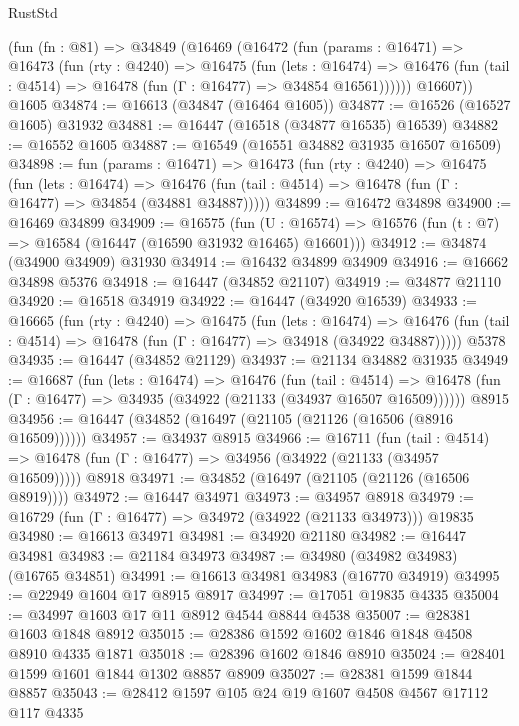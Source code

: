 \begin{lexlean}{RustStd}
\begin{coremodule}
    (fun (fn : @81) =>
    @34849
      (@16469
        (@16472
          (fun (params : @16471) =>
          @16473
            (fun (rty : @4240) =>
            @16475
              (fun (lets : @16474) =>
              @16476 (fun (tail : @4514) => @16478 (fun (Γ : @16477) => @34854 @16561))))))
        @16607))
    @1605
@34874 := @16613 (@34847 (@16464 @1605))
@34877 := @16526 (@16527 @1605) @31932
@34881 := @16447 (@16518 (@34877 @16535) @16539)
@34882 := @16552 @1605
@34887 := @16549 (@16551 @34882 @31935 @16507 @16509)
@34898 := fun (params : @16471) =>
  @16473
    (fun (rty : @4240) =>
    @16475
      (fun (lets : @16474) =>
      @16476 (fun (tail : @4514) => @16478 (fun (Γ : @16477) => @34854 (@34881 @34887)))))
@34899 := @16472 @34898
@34900 := @16469 @34899
@34909 := @16575
    (fun (U : @16574) => @16576 (fun (t : @7) => @16584 (@16447 (@16590 @31932 @16465) @16601)))
@34912 := @34874 (@34900 @34909) @31930
@34914 := @16432 @34899 @34909
@34916 := @16662 @34898 @5376
@34918 := @16447 (@34852 @21107)
@34919 := @34877 @21110
@34920 := @16518 @34919
@34922 := @16447 (@34920 @16539)
@34933 := @16665
    (fun (rty : @4240) =>
    @16475
      (fun (lets : @16474) =>
      @16476 (fun (tail : @4514) => @16478 (fun (Γ : @16477) => @34918 (@34922 @34887)))))
    @5378
@34935 := @16447 (@34852 @21129)
@34937 := @21134 @34882 @31935
@34949 := @16687
    (fun (lets : @16474) =>
    @16476
      (fun (tail : @4514) =>
      @16478 (fun (Γ : @16477) => @34935 (@34922 (@21133 (@34937 @16507 @16509))))))
    @8915
@34956 := @16447 (@34852 (@16497 (@21105 (@21126 (@16506 (@8916 @16509))))))
@34957 := @34937 @8915
@34966 := @16711
    (fun (tail : @4514) => @16478 (fun (Γ : @16477) => @34956 (@34922 (@21133 (@34957 @16509)))))
    @8918
@34971 := @34852 (@16497 (@21105 (@21126 (@16506 @8919))))
@34972 := @16447 @34971
@34973 := @34957 @8918
@34979 := @16729 (fun (Γ : @16477) => @34972 (@34922 (@21133 @34973))) @19835
@34980 := @16613 @34971
@34981 := @34920 @21180
@34982 := @16447 @34981
@34983 := @21184 @34973
@34987 := @34980 (@34982 @34983) (@16765 @34851)
@34991 := @16613 @34981 @34983 (@16770 @34919)
@34995 := @22949 @1604 @17 @8915 @8917
@34997 := @17051 @19835 @4335
@35004 := @34997 @1603 @17 @11 @8912 @4544 @8844 @4538
@35007 := @28381 @1603 @1848 @8912
@35015 := @28386 @1592 @1602 @1846 @1848 @4508 @8910 @4335 @1871
@35018 := @28396 @1602 @1846 @8910
@35024 := @28401 @1599 @1601 @1844 @1302 @8857 @8909
@35027 := @28381 @1599 @1844 @8857
@35043 := @28412
    @1597
    @105
    @24
    @19
    @1607
    @4508
    @4567
    @17112
    @117
    @4335

\end{coremodule}
\end{lexlean}
